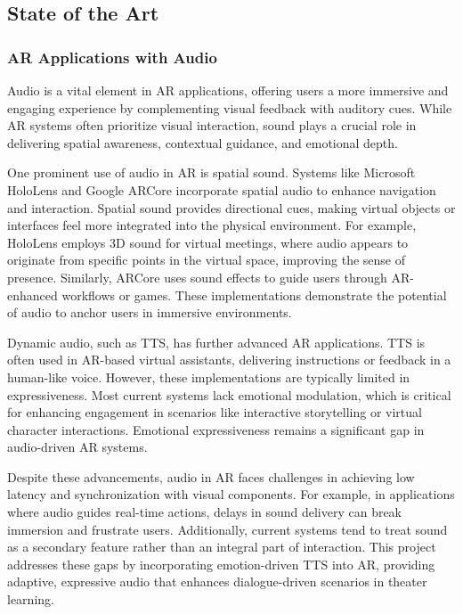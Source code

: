 \subsection{State of the Art}
\subsubsection{AR Applications with Audio}
Audio is a vital element in AR applications, offering users a more immersive and engaging experience by complementing visual feedback with auditory cues. While AR systems often prioritize visual interaction, sound plays a crucial role in delivering spatial awareness, contextual guidance, and emotional depth.

One prominent use of audio in AR is spatial sound. Systems like Microsoft HoloLens\cite{guo2022hololens} and Google ARCore\cite{oufqir2020arkit} incorporate spatial audio to enhance navigation and interaction. Spatial sound provides directional cues, making virtual objects or interfaces feel more integrated into the physical environment. For example, HoloLens employs 3D sound for virtual meetings, where audio appears to originate from specific points in the virtual space, improving the sense of presence. Similarly, ARCore uses sound effects to guide users through AR-enhanced workflows or games. These implementations demonstrate the potential of audio to anchor users in immersive environments.

Dynamic audio, such as TTS, has further advanced AR applications. TTS is often used in AR-based virtual assistants, delivering instructions or feedback in a human-like voice. However, these implementations are typically limited in expressiveness. Most current systems lack emotional modulation, which is critical for enhancing engagement in scenarios like interactive storytelling or virtual character interactions. Emotional expressiveness remains a significant gap in audio-driven AR systems.

Despite these advancements, audio in AR faces challenges in achieving low latency and synchronization with visual components. For example, in applications where audio guides real-time actions, delays in sound delivery can break immersion and frustrate users. Additionally, current systems tend to treat sound as a secondary feature rather than an integral part of interaction. This project addresses these gaps by incorporating emotion-driven TTS into AR, providing adaptive, expressive audio that enhances dialogue-driven scenarios in theater learning.

